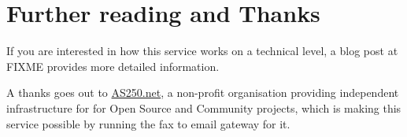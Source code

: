 \documentclass[DIV14,11pt]{scrartcl}
\begin{document}
\section*{Further reading and Thanks}

If you are interested in how this service works on a technical level, a blog
	post at FIXME provides more detailed information.

A thanks goes out to \href{https://as250.net}{AS250.net}, a non-profit organisation providing
	independent infrastructure for for Open Source and Community projects, which
	is making this service possible by running the fax to email gateway for it.
\end{document}

